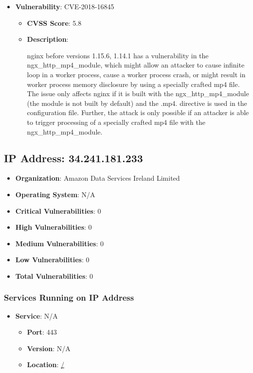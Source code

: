 \documentclass{article}
\begin{document}
\begin{itemize}
        \item \textbf{Vulnerability}: CVE-2018-16845
        \begin{itemize}
            \item \textbf{CVSS Score}:  5.8 
            \item \textbf{Description}:
            \parbox[t]{0.9\linewidth}{
                \ttfamily nginx before versions 1.15.6, 1.14.1 has a vulnerability in the ngx\_http\_mp4\_module, which might allow an attacker to cause infinite loop in a worker process, cause a worker process crash, or might result in worker process memory disclosure by using a specially crafted mp4 file. The issue only affects nginx if it is built with the ngx\_http\_mp4\_module (the module is not built by default) and the .mp4. directive is used in the configuration file. Further, the attack is only possible if an attacker is able to trigger processing of a specially crafted mp4 file with the ngx\_http\_mp4\_module.
            }
        \end{itemize}
    
\end{itemize}




\clearpage



\subsection{IP Address: 34.241.181.233}

\begin{itemize}
    \item \textbf{Organization}: Amazon Data Services Ireland Limited
    \item \textbf{Operating System}:  N/A 
    \item \textbf{Critical Vulnerabilities}: 0
    \item \textbf{High Vulnerabilities}: 0
    \item \textbf{Medium Vulnerabilities}: 0
    \item \textbf{Low Vulnerabilities}: 0
    \item \textbf{Total Vulnerabilities}: 0
\end{itemize}

\subsubsection*{Services Running on IP Address}

\begin{itemize}
    
        \item \textbf{Service}: N/A
        \begin{itemize}
            \item \textbf{Port}: 443
            \item \textbf{Version}:  N/A 
            \item \textbf{Location}: \href{ / }{ / }
        \end{itemize}
    
\end{itemize}
\end{document}
